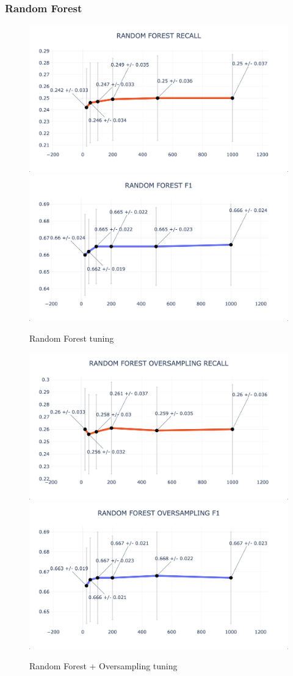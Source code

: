 \documentclass{article}
\begin{document}
	\subsubsection{Random Forest}
	
	\begin{figure}[H]
		\centering
		\includegraphics[width=.49\textwidth]{clf_img/RF_recall.png}
		\includegraphics[width=.49\textwidth]{clf_img/RF_f1.png}
		\caption{Random Forest tuning}
		\label{fig:hyper_rf}
	\end{figure}
	
	\begin{figure}[H]
		\centering
		\includegraphics[width=.49\textwidth]{clf_img/RF_OS_recall.png}
		\includegraphics[width=.49\textwidth]{clf_img/RF_OS_f1.png}
		\caption{Random Forest + Oversampling tuning}
		\label{fig:hyper_rf_os}
	\end{figure}
	
\end{document}
